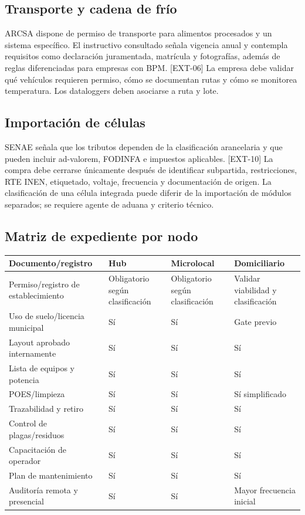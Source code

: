 \documentclass[11pt,a4paper]{article}
\begin{document}
\subsection{Transporte y cadena de frío}
ARCSA dispone de permiso de transporte para alimentos procesados y un sistema específico. El instructivo
consultado señala vigencia anual y contempla requisitos como declaración juramentada, matrícula y
fotografías, además de reglas diferenciadas para empresas con BPM. [EXT-06] La empresa debe validar qué
vehículos requieren permiso, cómo se documentan rutas y cómo se monitorea temperatura. Los dataloggers
deben asociarse a ruta y lote.

\subsection{Importación de células}
SENAE señala que los tributos dependen de la clasificación arancelaria y que pueden incluir ad-valorem,
FODINFA e impuestos aplicables. [EXT-10] La compra debe cerrarse únicamente después de identificar
subpartida, restricciones, RTE INEN, etiquetado, voltaje, frecuencia y documentación de origen. La
clasificación de una célula integrada puede diferir de la importación de módulos separados; se requiere
agente de aduana y criterio técnico.

\subsection{Matriz de expediente por nodo}
{\small
\begin{xltabular}{\textwidth}{@{}LP{3cm}P{3cm}P{3.2cm}@{}}
\toprule
\textbf{Documento/registro} & \textbf{Hub} & \textbf{Microlocal} & \textbf{Domiciliario}\\ \midrule
Permiso/registro de establecimiento & Obligatorio según clasificación & Obligatorio según clasificación & Validar viabilidad y clasificación\\
Uso de suelo/licencia municipal & Sí & Sí & Gate previo\\
Layout aprobado internamente & Sí & Sí & Sí\\
Lista de equipos y potencia & Sí & Sí & Sí\\
POES/limpieza & Sí & Sí & Sí simplificado\\
Trazabilidad y retiro & Sí & Sí & Sí\\
Control de plagas/residuos & Sí & Sí & Sí\\
Capacitación de operador & Sí & Sí & Sí\\
Plan de mantenimiento & Sí & Sí & Sí\\
Auditoría remota y presencial & Sí & Sí & Mayor frecuencia inicial\\
\bottomrule
\end{xltabular}}
\end{document}
